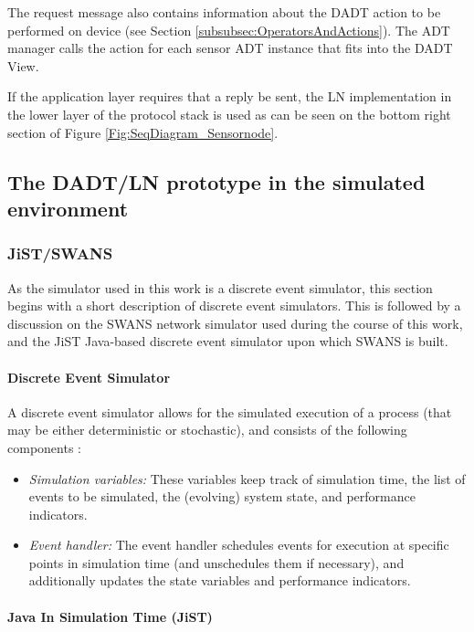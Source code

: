 The request message also contains information about the DADT action to be
performed on device (see Section \ref{subsubsec:OperatorsAndActions}). 
The ADT manager calls the action for each sensor ADT instance that fits into the DADT View. 

If the application layer requires that a reply be sent, the LN implementation in
the lower layer of the protocol stack is used as can be seen on the bottom
right section of Figure \ref{Fig:SeqDiagram_Sensornode}.


\subsection{The DADT/LN prototype in the simulated environment}
\subsubsection {JiST/SWANS} \label{sec:jistswans}

As the simulator used in this work is a discrete event simulator, this section 
begins with a short description of discrete event simulators. 
This is followed by a discussion on the SWANS network simulator used during the course of this work, and the JiST Java-based discrete event simulator upon which SWANS is built.

\paragraph{Discrete Event Simulator}

A discrete event simulator allows for the simulated execution of a process (that
may be either deterministic or stochastic), and consists of the following
components \cite{Shankar_DiscreteEventSim}:

\begin{itemize}
  \item \emph{Simulation variables:} These variables keep track of simulation 
  time, the list of events to be simulated, the (evolving) system state, and 
  performance indicators.
  \item \emph{Event handler:} The event handler schedules events for execution 
  at specific points in simulation time (and unschedules them if necessary), 
  and additionally updates the state variables and performance indicators.
\end{itemize}
 
\paragraph{Java In Simulation Time (JiST)} \label{subsec:jist}

